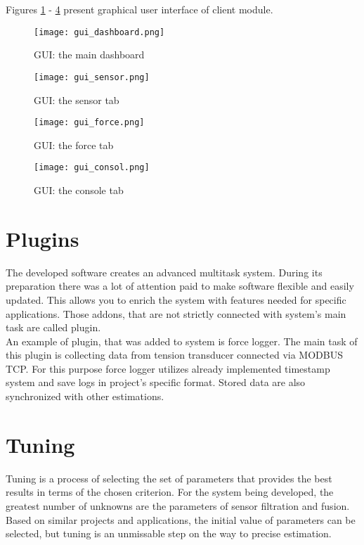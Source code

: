 Figures \ref{gui1} - \ref{gui4} present graphical user interface of client module.

\begin{figure}[!h]
	\centering
	\texttt{[image: gui\_dashboard.png]}
	\caption{GUI: the main dashboard}
	\label{gui1}
\end{figure}

\begin{figure}[!h]
	\centering
	\texttt{[image: gui\_sensor.png]}
	\caption{GUI: the sensor tab}
	\label{gui2}
\end{figure}

\begin{figure}[!h]
	\centering
	\texttt{[image: gui\_force.png]}
	\caption{GUI: the force tab}
	\label{gui3}
\end{figure}

\begin{figure}[!h]
	\centering
	\texttt{[image: gui\_consol.png]}
	\caption{GUI: the console tab}
	\label{gui4}
\end{figure}

\section{Plugins}

The developed software creates an advanced multitask system. During its preparation there was a lot of attention paid to make software flexible and easily updated. This allows you to enrich the system with features needed for specific applications. Those addons, that are not strictly connected with system's main task are called plugin.\\

An example of plugin, that was added to system is force logger. The main task of this plugin is collecting data from tension transducer connected via MODBUS TCP. For this purpose force logger utilizes already implemented timestamp system and save logs in project's specific format. Stored data are also synchronized with other estimations.

\section{Tuning}

Tuning is a process of selecting the set of parameters that provides the best results in terms of the chosen criterion. For the system being developed, the greatest number of unknowns are the parameters of sensor filtration and fusion. Based on similar projects and applications, the initial value of parameters can be selected, but tuning is an unmissable step on the way to precise estimation.\\

